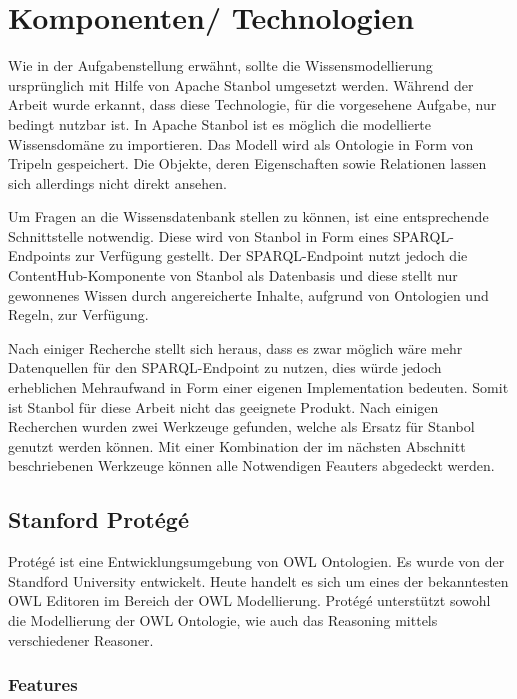 \chapter{Komponenten/ Technologien}
\label{chap:komponenten}
Wie in der Aufgabenstellung erwähnt, sollte die Wissensmodellierung ursprünglich mit Hilfe von Apache Stanbol umgesetzt werden. Während der Arbeit wurde erkannt, dass diese Technologie, für die vorgesehene Aufgabe, nur bedingt nutzbar  ist. In Apache Stanbol ist es möglich die modellierte Wissensdomäne zu importieren. Das Modell wird als Ontologie in Form von Tripeln gespeichert. Die Objekte, deren Eigenschaften sowie Relationen lassen sich allerdings nicht direkt ansehen.

Um Fragen an die Wissensdatenbank stellen zu können, ist eine entsprechende Schnittstelle notwendig. Diese wird von Stanbol in Form eines SPARQL-Endpoints zur Verfügung gestellt. Der SPARQL-Endpoint nutzt jedoch die ContentHub-Komponente von Stanbol als Datenbasis und diese stellt nur gewonnenes Wissen durch angereicherte Inhalte, aufgrund von Ontologien und Regeln, zur Verfügung.

Nach einiger Recherche stellt sich heraus, dass es zwar möglich wäre mehr Datenquellen für den SPARQL-Endpoint zu nutzen, dies würde jedoch erheblichen Mehraufwand in Form einer eigenen Implementation bedeuten. Somit ist Stanbol für diese Arbeit nicht das geeignete Produkt. Nach einigen Recherchen wurden zwei Werkzeuge gefunden, welche als Ersatz für Stanbol genutzt werden können. Mit einer Kombination der im nächsten Abschnitt beschriebenen Werkzeuge können alle Notwendigen Feauters abgedeckt werden.


\section{Stanford Protégé}
\label{sec:komponenten_protege}

Protégé ist eine Entwicklungsumgebung von OWL Ontologien. Es wurde von der Standford University entwickelt. Heute handelt es sich um  eines der bekanntesten OWL Editoren im Bereich der OWL Modellierung.
Protégé unterstützt sowohl die Modellierung der OWL Ontologie, wie auch das Reasoning mittels verschiedener Reasoner.


\subsection{Features}
\label{subsec:komponenten_protege_features}

